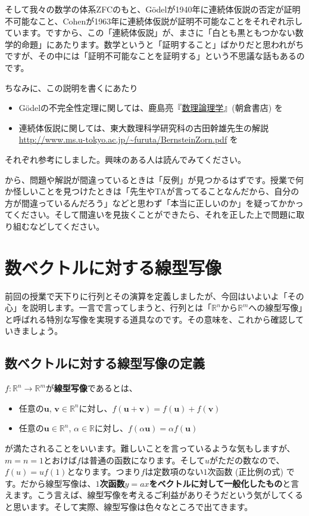 {そして我々の数学の体系ZFCのもと、G\"odelが1940年に連続体仮説の否定が証明不可能なこと、Cohenが1963年に連続体仮説が証明不可能なことをそれぞれ示しています。ですから、この「連続体仮説」が、まさに「白とも黒ともつかない数学的命題」にあたります。数学というと「証明すること」ばかりだと思われがちですが、その中には「証明不可能なことを証明する」という不思議な話もあるのです。

ちなみに、この説明を書くにあたり
\begin{itemize}
\item G\"odelの不完全性定理に関しては、鹿島亮『\href{http://www.asakura.co.jp/G_12.php?isbn=ISBN978-4-254-11765-3}{数理論理学}』(朝倉書店) を
\item 連続体仮説に関しては、東大数理科学研究科の古田幹雄先生の解説 \url{http://www.ms.u-tokyo.ac.jp/~furuta/BernsteinZorn.pdf} を
\end{itemize}
それぞれ参考にしました。興味のある人は読んでみてください。
}から、問題や解説が間違っているときは「反例」が見つかるはずです。授業で何か怪しいことを見つけたときは「先生やTAが言ってることなんだから、自分の方が間違っているんだろう」などと思わず「本当に正しいのか」を疑ってかかってください。そして間違いを見抜くことができたら、それを正した上で問題に取り組むなどしてください。

\section{数ベクトルに対する線型写像}

前回の授業で天下りに行列とその演算を定義しましたが、今回はいよいよ「その心」を説明します。一言で言ってしまうと、行列とは「$\mathbb{R}^n$から$\mathbb{R}^m$への線型写像」と呼ばれる特別な写像を実現する道具なのです。その意味を、これから確認していきましょう。

\subsection{数ベクトルに対する線型写像の定義}

$f\colon\mathbb{R}^n \rightarrow \mathbb{R}^m$が\textbf{線型写像}であるとは、
\begin{itemize}
\item 任意の$\bm{u}$, $\bm{v}\in\mathbb{R}^n$に対し、$f(\bm{u} + \bm{v}) = f(\bm{u}) + f(\bm{v})$
\item 任意の$\bm{u}\in\mathbb{R}^n$, $\alpha\in\mathbb{R}$に対し、$f(\alpha\bm{u}) = \alpha f(\bm{u})$
\end{itemize}
が満たされることをいいます。難しいことを言っているような気もしますが、$m = n = 1$とおけば$f$は普通の函数になります。そして$u$がただの数なので、$f(u) = u f(1)$となります。つまり$f$は定数項のない$1$次函数 (正比例の式) です。だから線型写像は、\textbf{$1$次函数$y = ax$をベクトルに対して一般化したもの}と言えます。こう言えば、線型写像を考えるご利益がありそうだという気がしてくると思います。そして実際、線型写像は色々なところで出てきます。

